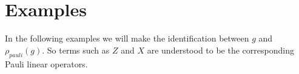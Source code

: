 \documentclass[12pt]{article}
\begin{document}
%
%
%
%



%
%
%

%
%

\section{Examples}

In the following examples we will make the identification
between $g$ and $\rho_{pauli}(g)$.
So terms such as $Z$ and $X$ are understood
to be the corresponding Pauli linear operators.
\end{document}
